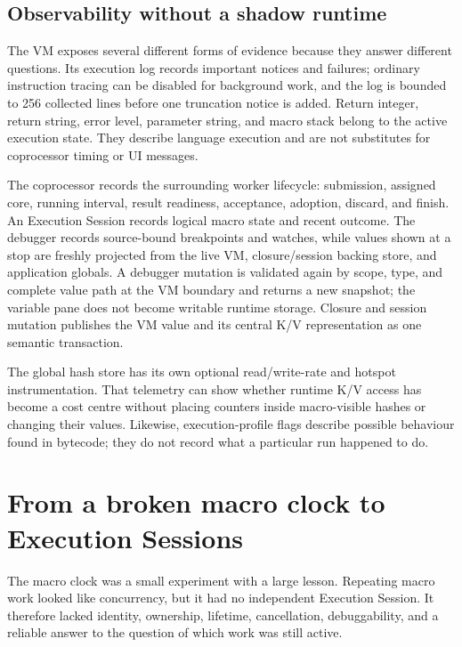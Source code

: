 \documentclass[a4paper,10pt,twoside,openany]{book}
\begin{document}
\section{Observability without a shadow runtime}

The VM exposes several different forms of evidence because they answer
different questions. Its execution log records important notices and failures;
ordinary instruction tracing can be disabled for background work, and the log
is bounded to 256 collected lines before one truncation notice is added. Return
integer, return string, error level, parameter string, and macro stack belong
to the active execution state. They describe language execution and are not
substitutes for coprocessor timing or UI messages.

The coprocessor records the surrounding worker lifecycle: submission, assigned
core, running interval, result readiness, acceptance, adoption, discard, and
finish. An Execution Session records logical macro state and recent outcome.
The debugger records source-bound breakpoints and watches, while values shown
at a stop are freshly projected from the live VM, closure/session backing
store, and application globals. A debugger mutation is validated again by
scope, type, and complete value path at the VM boundary and returns a new
snapshot; the variable pane does not become writable runtime storage.
Closure and session mutation publishes the VM value and its central K/V
representation as one semantic transaction.

The global hash store has its own optional read/write-rate and hotspot
instrumentation. That telemetry can show whether runtime K/V access has become
a cost centre without placing counters inside macro-visible hashes or changing
their values. Likewise, execution-profile flags describe possible behaviour
found in bytecode; they do not record what a particular run happened to do.

\chapter{From a broken macro clock to Execution Sessions}
\label{ch:execution-sessions}

The macro clock was a small experiment with a large lesson. Repeating macro
work looked like concurrency, but it had no independent Execution Session.
It therefore lacked identity, ownership, lifetime, cancellation, debuggability,
and a reliable answer to the question of which work was still active.
\end{document}
